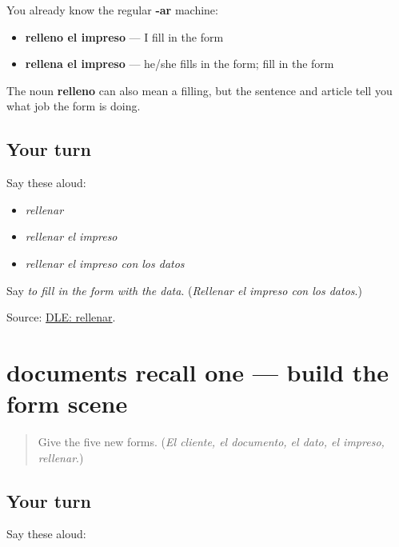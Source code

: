 \begin{grammarlens}[title={Grammar Lens: a regular -ar action}]
You already know the regular \textbf{-ar} machine:

\begin{itemize}
\raggedright
  \item \textbf{relleno el impreso} — I fill in the form
  \item \textbf{rellena el impreso} — he/she fills in the form; fill in the form
\end{itemize}

The noun \textbf{relleno} can also mean a filling, but the sentence and article tell you what job the form is doing.
\end{grammarlens}

\subsection*{Your turn}
Say these aloud:

\begin{itemize}
\raggedright
  \item \emph{rellenar}
  \item \emph{rellenar el impreso}
  \item \emph{rellenar el impreso con los datos}
\end{itemize}

\begin{tcolorbox}[breakable,colback=teal!4,colframe=teal!35!black,title={Before you move on}]
Say \emph{to fill in the form with the data}. (\emph{Rellenar el impreso con los datos}.)

Source: \href{https://dle.rae.es/rellenar}{DLE: rellenar}.
\end{tcolorbox}
\section[(review)]{documents recall one — build the form scene}

\label{lesson:ES-C406-documents-recall-1}



\begin{quote}
Give the five new forms. (\emph{El cliente, el documento, el dato, el impreso, rellenar}.)
\end{quote}

\subsection*{Your turn}
Say these aloud:

